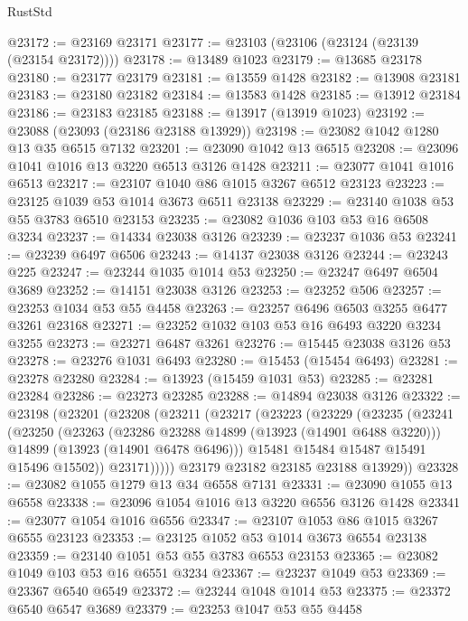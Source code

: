 \begin{lexlean}{RustStd}
\begin{coremodule}
@23172 := @23169 @23171
@23177 := @23103 (@23106 (@23124 (@23139 (@23154 @23172))))
@23178 := @13489 @1023
@23179 := @13685 @23178
@23180 := @23177 @23179
@23181 := @13559 @1428
@23182 := @13908 @23181
@23183 := @23180 @23182
@23184 := @13583 @1428
@23185 := @13912 @23184
@23186 := @23183 @23185
@23188 := @13917 (@13919 @1023)
@23192 := @23088 (@23093 (@23186 @23188 @13929))
@23198 := @23082 @1042 @1280 @13 @35 @6515 @7132
@23201 := @23090 @1042 @13 @6515
@23208 := @23096 @1041 @1016 @13 @3220 @6513 @3126 @1428
@23211 := @23077 @1041 @1016 @6513
@23217 := @23107 @1040 @86 @1015 @3267 @6512 @23123
@23223 := @23125 @1039 @53 @1014 @3673 @6511 @23138
@23229 := @23140 @1038 @53 @55 @3783 @6510 @23153
@23235 := @23082 @1036 @103 @53 @16 @6508 @3234
@23237 := @14334 @23038 @3126
@23239 := @23237 @1036 @53
@23241 := @23239 @6497 @6506
@23243 := @14137 @23038 @3126
@23244 := @23243 @225
@23247 := @23244 @1035 @1014 @53
@23250 := @23247 @6497 @6504 @3689
@23252 := @14151 @23038 @3126
@23253 := @23252 @506
@23257 := @23253 @1034 @53 @55 @4458
@23263 := @23257 @6496 @6503 @3255 @6477 @3261 @23168
@23271 := @23252 @1032 @103 @53 @16 @6493 @3220 @3234 @3255
@23273 := @23271 @6487 @3261
@23276 := @15445 @23038 @3126 @53
@23278 := @23276 @1031 @6493
@23280 := @15453 (@15454 @6493)
@23281 := @23278 @23280
@23284 := @13923 (@15459 @1031 @53)
@23285 := @23281 @23284
@23286 := @23273 @23285
@23288 := @14894 @23038 @3126
@23322 := @23198
    (@23201
      (@23208
        (@23211
          (@23217
            (@23223
              (@23229
                (@23235
                  (@23241
                    (@23250
                      (@23263
                        (@23286 @23288 @14899 (@13923 (@14901 @6488 @3220)))
                        @14899
                        (@13923 (@14901 @6478 @6496)))
                      @15481
                      @15484
                      @15487
                      @15491
                      @15496
                      @15502))
                  @23171)))))
        @23179
        @23182
        @23185
        @23188
        @13929))
@23328 := @23082 @1055 @1279 @13 @34 @6558 @7131
@23331 := @23090 @1055 @13 @6558
@23338 := @23096 @1054 @1016 @13 @3220 @6556 @3126 @1428
@23341 := @23077 @1054 @1016 @6556
@23347 := @23107 @1053 @86 @1015 @3267 @6555 @23123
@23353 := @23125 @1052 @53 @1014 @3673 @6554 @23138
@23359 := @23140 @1051 @53 @55 @3783 @6553 @23153
@23365 := @23082 @1049 @103 @53 @16 @6551 @3234
@23367 := @23237 @1049 @53
@23369 := @23367 @6540 @6549
@23372 := @23244 @1048 @1014 @53
@23375 := @23372 @6540 @6547 @3689
@23379 := @23253 @1047 @53 @55 @4458

\end{coremodule}
\end{lexlean}
